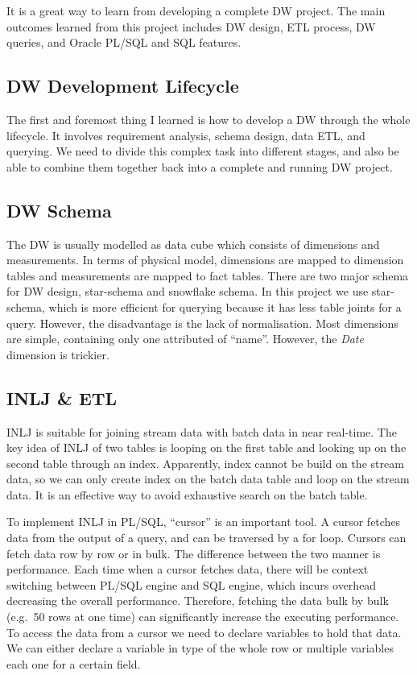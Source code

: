 \documentclass[
  a4paper,
]{article}
\begin{document}
It is a great way to learn from developing a complete DW project. The
main outcomes learned from this project includes DW design, ETL process,
DW queries, and Oracle PL/SQL and SQL features.

\hypertarget{dw-development-lifecycle}{%
\subsection{DW Development Lifecycle}\label{dw-development-lifecycle}}

The first and foremost thing I learned is how to develop a DW through
the whole lifecycle. It involves requirement analysis, schema design,
data ETL, and querying. We need to divide this complex task into
different stages, and also be able to combine them together back into a
complete and running DW project.

\hypertarget{dw-schema}{%
\subsection{DW Schema}\label{dw-schema}}

The DW is usually modelled as data cube which consists of dimensions and
measurements. In terms of physical model, dimensions are mapped to
dimension tables and measurements are mapped to fact tables. There are
two major schema for DW design, star-schema and snowflake schema. In
this project we use star-schema, which is more efficient for querying
because it has less table joints for a query. However, the disadvantage
is the lack of normalisation. Most dimensions are simple, containing
only one attributed of ``name''. However, the \emph{Date} dimension is
trickier.

\hypertarget{inlj-etl}{%
\subsection{INLJ \& ETL}\label{inlj-etl}}

INLJ is suitable for joining stream data with batch data in near
real-time. The key idea of INLJ of two tables is looping on the first
table and looking up on the second table through an index. Apparently,
index cannot be build on the stream data, so we can only create index on
the batch data table and loop on the stream data. It is an effective way
to avoid exhaustive search on the batch table.

To implement INLJ in PL/SQL, ``cursor'' is an important tool. A cursor
fetches data from the output of a query, and can be traversed by a for
loop. Cursors can fetch data row by row or in bulk. The difference
between the two manner is performance. Each time when a cursor fetches
data, there will be context switching between PL/SQL engine and SQL
engine, which incurs overhead decreasing the overall performance.
Therefore, fetching the data bulk by bulk (e.g.~50 rows at one time) can
significantly increase the executing performance. To access the data
from a cursor we need to declare variables to hold that data. We can
either declare a variable in type of the whole row or multiple variables
each one for a certain field.
\end{document}
